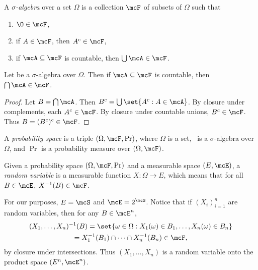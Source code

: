 \begin{definition} \label{def:sigma_algebra}
    A \emph{$\sigma$-algebra} over a set $\Omega$ is a collection $\F$ of
    subsets of $\Omega$ such that
    \begin{enumerate}
        \item $\O \in \F$,
        \item if $A \in \F$, then $A^c \in \F$,
        \item if $\mcA \subseteq \F$ is countable, then
            $\bigcup \mcA \in \F$.
    \end{enumerate}
\end{definition}
\begin{proposition}
    Let \F{} be a $\sigma$-algebra over $\Omega$.
    Then if $\mcA \subseteq \F$ is countable, then
    $\bigcap \mcA \in \F$.
\end{proposition}
\begin{proof}
    Let $B = \bigcap \mcA$.
    Then $B^c = \bigcup \set{A^c : A \in \mcA}$.
    By closure under complements, each $A^c \in \F$.
    By closure under countable unions, $B^c \in \F$.
    Thus $B = (B^c)^c \in \F$.
\end{proof}
\begin{definition*} \label{def:probability_space}
    A \emph{probability space} is a triple $(\Omega, \F, \Pr)$, where
    $\Omega$ is a set, \F\ is a $\sigma$-algebra over $\Omega$, and
    $\Pr$ is a probability measure over $(\Omega, \F)$.
\end{definition*}

\begin{definition} \label{def:random_variable}
    Given a probability space $(\Omega, \F, \Pr)$ and a
    measurable space $(E, \mcE)$, a \emph{random variable} is a measurable
    function $X : \Omega \to E$, which means that for all $B \in \mcE$,
    $X^{-1}(B) \in \F$.
\end{definition}
For our purposes, $E = \mcS$ and $\mcE = 2^\mcS$.
Notice that if $(X_i)_{i=1}^n$ are random variables, then for any
$B \in \mcE^n$, \begin{multline*}
    (X_1, \dots, X_n)^{-1}(B) = \set{
        \omega \in \Omega : X_1(\omega) \in B_1, \dots, X_n(\omega) \in B_n
    } \\
    = X_1^{-1}(B_1) \cap \cdots \cap X_n^{-1}(B_n) \in \F,
\end{multline*} by closure under intersections.
Thus $(X_1, \dots, X_n)$ is a random variable onto the product space
$(E^n, \mcE^n)$.

